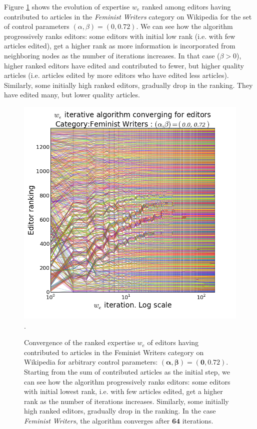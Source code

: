 Figure \ref{fig:convergence} shows the evolution of expertise $w_e$ ranked among editors having contributed to articles in the {\it Feminist Writers} category on Wikipedia for the set of control parameters $(\alpha,\beta) =(0, 0.72)$. We can see how the algorithm progressively ranks editors: some editors with initial low rank (i.e. with few articles edited), get a higher rank as more information is incorporated from neighboring nodes as the number of iterations increases. In that case ($\beta >0$), higher ranked editors have edited and contributed to fewer, but higher quality articles (i.e. articles edited by more editors who have edited less articles). Similarly, some initially high ranked editors, gradually drop in the ranking. They have edited many, but lower quality articles. 

\begin{figure}[!t]
\centering
\includegraphics[width=0.9\columnwidth]{../Figures/fem_editors_iter_converge.png}.
\caption{Convergence of the ranked expertise $w_e$ of editors having contributed to articles in the Feminist Writers category on Wikipedia for arbitrary control parameters: $\mathbf{(\alpha,\beta) =(0, 0.72)}$. Starting from the sum of contributed articles as the initial step, we can see how the algorithm progressively ranks editors: some editors with initial lowest rank, i.e. with few articles edited, get a higher rank as the number of iterations increases. Similarly, some initially high ranked editors, gradually drop in the ranking. In the case {\it Feminist Writers}, the algorithm converges after $\mathbf{64}$ iterations.}
\label{fig:convergence}
\end{figure}

